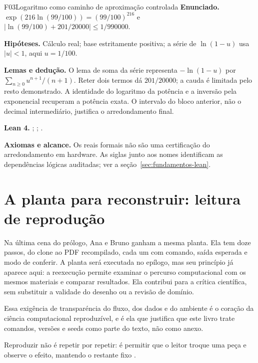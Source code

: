 \begin{formalizacao}{F03}{Logaritmo como caminho de aproximação controlada}
\textbf{Enunciado.} $\exp(216\ln(99/100))=(99/100)^{216}$ e $|\ln(99/100)+201/20000|\leq1/990000$.

\textbf{Hipóteses.} Cálculo real; base estritamente positiva; a série de $\ln(1-u)$ usa $|u|<1$, aqui $u=1/100$.

\textbf{Lemas e dedução.} O lema de soma da série representa $-\ln(1-u)$ por $\sum_{n\geq0}u^{n+1}/(n+1)$. Reter dois termos dá $201/20000$; a cauda é limitada pelo resto demonstrado. A identidade do logaritmo da potência e a inversão pela exponencial recuperam a potência exata. O intervalo do bloco anterior, não o decimal intermediário, justifica o arredondamento final.

\textbf{Lean 4.} ; ; .

\textbf{Axiomas e alcance.} Os reais formais não são uma certificação do arredondamento em hardware. As siglas junto aos nomes identificam as dependências lógicas auditadas; ver a seção~\ref{sec:fundamentos-lean}.
\end{formalizacao}


\section{A planta para reconstruir: leitura de reprodu\c{c}\~ao}

Na \'ultima cena do pr\'ologo, Ana e Bruno ganham a mesma planta. Ela tem doze passos, do clone ao PDF recompilado, cada um com comando, sa\'ida esperada e modo de conferir. A planta ser\'a executada no ep\'ilogo, mas seu princ\'ipio j\'a aparece aqui: a reexecu\c{c}\~ao permite examinar o percurso computacional com os mesmos materiais e comparar resultados. Ela contribui para a cr\'itica cient\'ifica, sem substituir a validade do desenho ou a revis\~ao de dom\'inio.

Essa exig\^encia de transpar\'encia do fluxo, dos dados e do ambiente \'e o cora\c{c}\~ao da ci\^encia computacional reproduz\'ivel, e \'e ela que justifica que este livro trate comandos, vers\~oes e seeds como parte do texto, n\~ao como anexo.

Reproduzir n\~ao \'e repetir por repetir: \'e permitir que o leitor troque uma pe\c{c}a e observe o efeito, mantendo o restante fixo .

